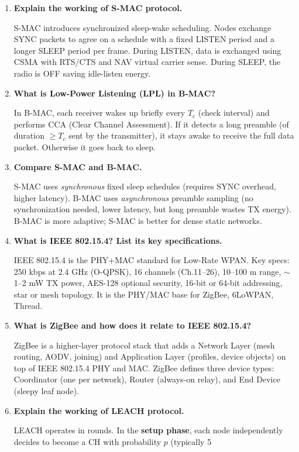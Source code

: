\documentclass[12pt,a4paper]{article}
\newcommand{\Q}[1]{\textbf{#1}\par\noindent\ignorespaces}
\begin{document}
\begin{tcolorbox}[exambox, title={\textbf{Frequently Asked / Viva Questions}}]
\begin{enumerate}[topsep=0pt, label=\textbf{Q\arabic*.}, itemsep=5pt]
  \item \Q{Explain the working of S-MAC protocol.}
  S-MAC introduces synchronized sleep-wake scheduling. Nodes exchange SYNC packets to agree on a schedule with a fixed LISTEN period and a longer SLEEP period per frame. During LISTEN, data is exchanged using CSMA with RTS/CTS and NAV virtual carrier sense. During SLEEP, the radio is OFF saving idle-listen energy.

  \item \Q{What is Low-Power Listening (LPL) in B-MAC?}
  In B-MAC, each receiver wakes up briefly every $T_c$ (check interval) and performs CCA (Clear Channel Assessment). If it detects a long preamble (of duration $\geq T_c$ sent by the transmitter), it stays awake to receive the full data packet. Otherwise it goes back to sleep.

  \item \Q{Compare S-MAC and B-MAC.}
  S-MAC uses \textit{synchronous} fixed sleep schedules (requires SYNC overhead, higher latency). B-MAC uses \textit{asynchronous} preamble sampling (no synchronization needed, lower latency, but long preamble wastes TX energy). B-MAC is more adaptive; S-MAC is better for dense static networks.

  \item \Q{What is IEEE 802.15.4? List its key specifications.}
  IEEE 802.15.4 is the PHY+MAC standard for Low-Rate WPAN. Key specs: 250 kbps at 2.4 GHz (O-QPSK), 16 channels (Ch.11--26), 10--100 m range, $\sim$1--2 mW TX power, AES-128 optional security, 16-bit or 64-bit addressing, star or mesh topology. It is the PHY/MAC base for ZigBee, 6LoWPAN, Thread.

  \item \Q{What is ZigBee and how does it relate to IEEE 802.15.4?}
  ZigBee is a higher-layer protocol stack that adds a Network Layer (mesh routing, AODV, joining) and Application Layer (profiles, device objects) on top of IEEE 802.15.4 PHY and MAC. ZigBee defines three device types: Coordinator (one per network), Router (always-on relay), and End Device (sleepy leaf node).

  \item \Q{Explain the working of LEACH protocol.}
  LEACH operates in rounds. In the \textbf{setup phase}, each node independently decides to become a CH with probability $p$ (typically 5%


\end{enumerate}
\end{tcolorbox}
\end{document}
